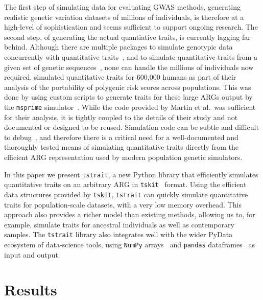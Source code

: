 \documentclass[unnumsec,webpdf,modern,large,namedate]{oup-authoring-template}%
\begin{document}
The first step of simulating data for evaluating GWAS methods,
generating realistic genetic variation datasets of millions
of individuals, is therefore at a high-level of sophistication
and seems sufficient to support ongoing research.
The second step, of generating the actual quantiative traits,
is currently lagging far behind.
Although there are multiple packages to simulate genotypic data
concurrently with quantitative traits~\citep{gaynor2021,haller2023},
and to simulate quantitative traits from a given set of genetic
sequences~\citep[e.g.][]{meyer2018,fernandes2020}, none can
handle the millions of individuals now required.
\citet{martin2017} simulated quantitative traits for
600,000 humans as part of their analysis of the portability
of polygenic risk scores across populations. This was
done by using custom scripts to generate traits for these
large ARGs output by the \texttt{msprime}
simulator~\cite{kelleher2016efficient}.
While the code provided by Martin et al.\ was sufficient
for their analysis, it is tightly coupled to the details of their study
and not documented or designed to be reused.
Simulation code can be subtle and difficult to
debug~\citep{ragsdale2020lessons}, and therefore there
is a critical need for a well-documented and
thoroughly tested means of simulating quantitative
traits directly from the efficient ARG representation used by
modern population genetic simulators.

In this paper we present \texttt{tstrait}, a new Python library that
efficiently simulates quantitative traits on an arbitrary ARG
in \texttt{tskit}~\citep{ralph2020} format.
Using the efficient data structures provided by \texttt{tskit},
\texttt{tstrait} can
quickly simulate quantitative traits for population-scale datasets,
with a very low memory overhead. This approach also provides a
richer model than existing methods,
allowing us to, for example, simulate traits for
ancestral individuals as well as contemporary samples.
The \texttt{tstrait} library also integrates well with the wider
PyData ecosystem of data-science tools,
using
\texttt{NumPy} arrays~\citep{numpy} and
\texttt{pandas} dataframes~\citep{pandas}
as input and output.

\section{Results}
\end{document}
